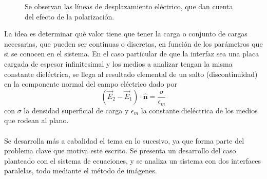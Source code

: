 \documentclass[12pt, oneside, numbers, spanish]{ezthesis}
\numberwithin{equation}{section}
\begin{document}
\begin{figure}[H]
\vspace{2cm}
\centering

\caption{Se observan las líneas de desplazamiento eléctrico, que dan cuenta del efecto de la polarización.}
\end{figure}
\noindent
La idea es determinar qué valor tiene que tener la carga o conjunto de cargas necesarias, que pueden ser continuas o discretas, en función de los parámetros que si se conocen en el sistema. En el caso particular de que la interfaz sea una placa cargada de espesor infinitesimal y los medios a analizar tengan la misma constante dieléctrica, se llega al resultado elemental de un salto (discontinuidad) en la componente normal del campo eléctrico dado por
\begin{equation}
(\vec{E}_2 - \vec{E}_1)\cdot\hat{\mathbf{n}} = \frac{\sigma}{\epsilon_m}
\end{equation}
con $\sigma$ la densidad superficial de carga y $\epsilon_m$ la constante dieléctrica de los medios que rodean al plano. \\\\
Se desarrolla más a cabalidad el tema en lo sucesivo, ya que forma parte del problema clave que motiva este escrito. Se presenta un desarrollo del caso planteado con el sistema de ecuaciones, y se analiza un sistema con dos interfaces paralelas, todo mediante el método de imágenes. 
\end{document}
